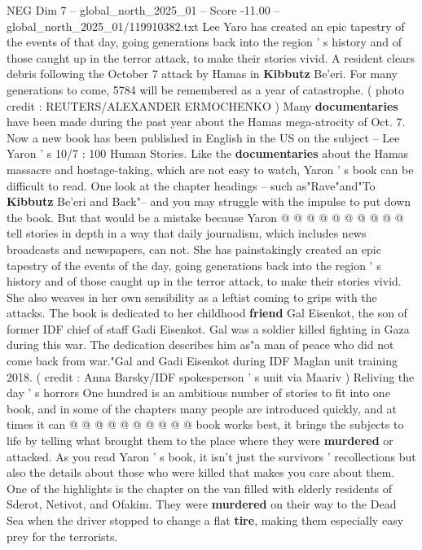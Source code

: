 \begin{textsample}{NEG Dim 7 – global\_north\_2025\_01 – Score -11.00 – global\_north\_2025\_01/119910382.txt}  \label{ex:f7_neg_055}
Lee Yaro has created an epic tapestry of the events of that day, going generations back into the region ' s history and of those caught up in the terror attack, to make their stories vivid.
A resident clears debris following the October 7 attack by Hamas in \textbf{Kibbutz} Be'eri.
For many generations to come, 5784 will be remembered as a year of catastrophe. ( photo credit : REUTERS/ALEXANDER ERMOCHENKO ) Many \textbf{documentaries} have been made during the past year about the Hamas mega-atrocity of Oct. 7.
Now a new book has been published in English in the US on the subject -- Lee Yaron ' s 10/7 : 100 Human Stories.
Like the \textbf{documentaries} about the Hamas massacre and hostage-taking, which are not easy to watch, Yaron ' s book can be difficult to read.
One look at the chapter headings -- such as"Rave"and"To \textbf{Kibbutz} Be'eri and Back"-- and you may struggle with the impulse to put down the book.
But that would be a mistake because Yaron @ @ @ @ @ @ @ @ @ @ tell stories in depth in a way that daily journalism, which includes news broadcasts and newspapers, can not.
She has painstakingly created an epic tapestry of the events of the day, going generations back into the region ' s history and of those caught up in the terror attack, to make their stories vivid.
She also weaves in her own sensibility as a leftist coming to grips with the attacks.
The book is dedicated to her childhood \textbf{friend} Gal Eisenkot, the son of former IDF chief of staff Gadi Eisenkot.
Gal was a soldier killed fighting in Gaza during this war.
The dedication describes him as"a man of peace who did not come back from war."Gal and Gadi Eisenkot during IDF Maglan unit training 2018. ( credit : Anna Barsky/IDF spokesperson ' s unit via Maariv ) Reliving the day ' s horrors One hundred is an ambitious number of stories to fit into one book, and in some of the chapters many people are introduced quickly, and at times it can @ @ @ @ @ @ @ @ @ @ book works best, it brings the subjects to life by telling what brought them to the place where they were \textbf{murdered} or attacked.
As you read Yaron ' s book, it isn't just the survivors ' recollections but also the details about those who were killed that makes you care about them.
One of the highlights is the chapter on the van filled with elderly residents of Sderot, Netivot, and Ofakim.
They were \textbf{murdered} on their way to the Dead Sea when the driver stopped to change a flat \textbf{tire}, making them especially easy prey for the terrorists.

\end{textsample}
